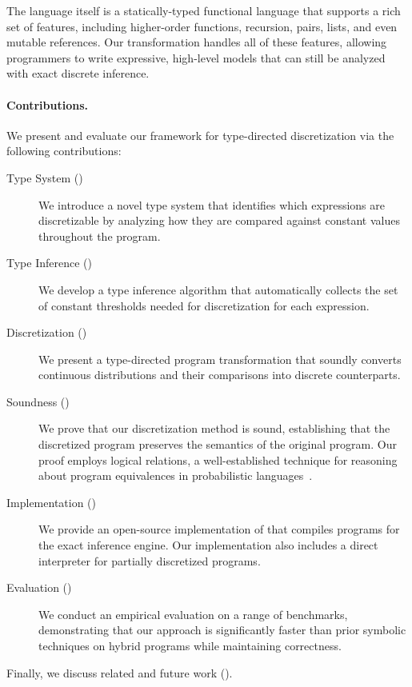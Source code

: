 The \Slice{} language itself is a statically-typed functional language that supports a rich set of features, including higher-order functions, recursion, pairs, lists, and even mutable references. Our transformation handles all of these features, allowing programmers to write expressive, high-level models that can still be analyzed with exact discrete inference.

\paragraph{Contributions.}
We present and evaluate our framework for type-directed discretization via the following contributions:

\begin{description}
    \item[Type System ()] We introduce a novel type system that identifies which expressions are discretizable by analyzing how they are compared against constant values throughout the program.

    \item[Type Inference ()] We develop a type inference algorithm that automatically collects the set of constant thresholds needed for discretization for each expression.

    \item[Discretization ()] We present a type-directed program transformation that soundly converts continuous distributions and their comparisons into discrete counterparts.

    \item[Soundness ()] We prove that our discretization method is sound, establishing that the discretized program preserves the semantics of the original program. Our proof employs logical relations, a well-established technique for reasoning about program equivalences in probabilistic languages~\cite{Bizjak2015Step,Wand2018Contextual}.

    \item[Implementation ()] We provide an open-source implementation of \Slice{} that compiles programs for the \Dice{} exact inference engine. Our implementation also includes a direct interpreter for partially discretized programs.

    \item[Evaluation ()] We conduct an empirical evaluation on a range of benchmarks, demonstrating that our approach is significantly faster than prior symbolic techniques on hybrid programs while maintaining correctness.
\end{description}

Finally, we discuss related and future work ().

